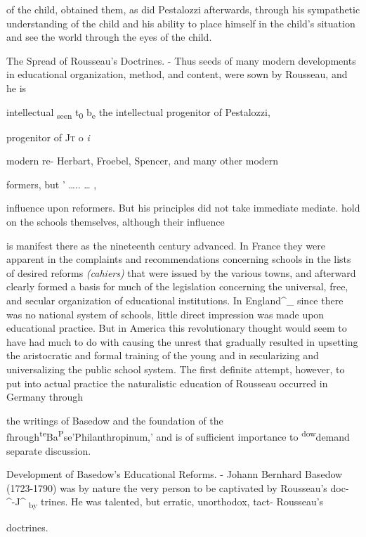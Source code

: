 \documentclass[]{book}
\begin{document}
of the child, obtained them, as did Pestalozzi afterwards, through his sympathetic understanding of the child and his ability to place himself in the child's situation and see the world through the eyes of the child.

The Spread of Rousseau's Doctrines. - Thus seeds of many modern developments in educational organization, method, and content, were sown by Rousseau, and he is

intellectual \textsubscript{seen} t\textsubscript{0} b\textsubscript{e} the intellectual progenitor of Pestalozzi,

progenitor of \textsc{Jt }o \emph{i}

modern re- Herbart, Froebel, Spencer, and many other modern

formers, but ' \ldots{}.. \ldots{} ,

influence upon reformers. But his principles did not take immediate mediate. hold on the schools themselves, although their influence

is manifest there as the nineteenth century advanced. In France they were apparent in the complaints and recommendations concerning schools in the lists of desired reforms \emph{(cahiers)} that were issued by the various towns, and afterward clearly formed a basis for much of the legislation concerning the universal, free, and secular organization of educational institutions. In England\^{}\_ since there was no national system of schools, little direct impression was made upon educational practice. But in America this revolutionary thought would seem to have had much to do with causing the unrest that gradually resulted in upsetting the aristocratic and formal training of the young and in secularizing and universalizing the public school system. The first definite attempt, however, to put into actual practice the naturalistic education of Rousseau occurred in Germany through

the writings of Basedow and the foundation of the fhrough\textsuperscript{te}Ba\textsuperscript{P}se'Philanthropinum,' and is of sufficient importance to \textsuperscript{dow}demand separate discussion.

Development of Basedow's Educational Reforms. - Johann Bernhard Basedow (1723-1790) was by nature the very person to be captivated by Rousseau's doc- \^{}-J\^{} \textsubscript{by} trines. He was talented, but erratic, unorthodox, tact- Rousseau's

doctrines.
\end{document}
